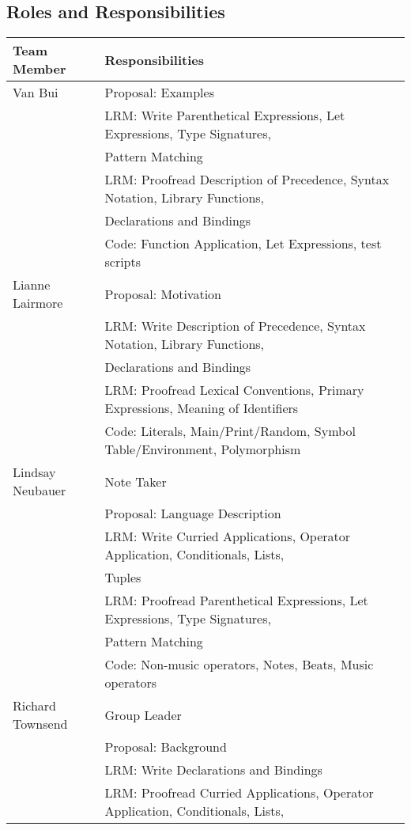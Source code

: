 	\subsection{Roles and Responsibilities}
		\begin{table}[htdp]
		\begin{tabular}{|l|l|}
		\hline
		Team Member & Responsibilities \\ 
		\hline
		Van Bui & Proposal: Examples \\
					& LRM: Write Parenthetical Expressions, Let Expressions, Type Signatures, \\
					& Pattern Matching \\
					& LRM: Proofread  Description of Precedence, Syntax Notation, Library Functions, \\ 
					& Declarations and Bindings \\
					& Code: Function Application, Let Expressions, test scripts  \\
		Lianne Lairmore & Proposal: Motivation \\
									& LRM: Write Description of Precedence, Syntax Notation, Library Functions, \\
									& Declarations and Bindings \\
									& LRM: Proofread Lexical Conventions, Primary Expressions, Meaning of Identifiers \\
									& Code: Literals, Main/Print/Random, Symbol Table/Environment, Polymorphism \\
		Lindsay Neubauer & Note Taker \\
										& Proposal: Language Description\\
										& LRM: Write Curried Applications, Operator Application, Conditionals, Lists, \\
										& Tuples \\
										& LRM: Proofread Parenthetical Expressions, Let Expressions, Type Signatures, \\ 
										& Pattern Matching \\
										& Code: Non-music operators, Notes, Beats, Music operators \\
		Richard Townsend & Group Leader \\
										& Proposal: Background \\
										& LRM:  Write Declarations and Bindings \\
										& LRM: Proofread Curried Applications, Operator Application, Conditionals, Lists, \\

\end{tabular}
\end{table}
